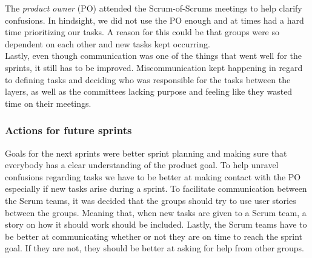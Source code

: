 \noindent The \textit{product owner} (PO) attended the Scrum-of-Scrums meetings to help clarify confusions. In hindsight, we did not use the PO enough and at times had a hard time prioritizing our tasks. A reason for this could be that groups were so dependent on each other and new tasks kept occurring. \\

\noindent Lastly, even though communication was one of the things that went well for the sprints, it still has to be improved. Miscommunication kept happening in regard to defining tasks and deciding who was responsible for the tasks between the layers, as well as the committees lacking purpose and feeling like they wasted time on their meetings.

\subsubsection{Actions for future sprints}
Goals for the next sprints were better sprint planning and making sure that everybody has a clear understanding of the product goal. 
To help unravel confusions regarding tasks we have to be better at making contact with the PO especially if new tasks arise during a sprint. 
To facilitate communication between the Scrum teams, it was decided that the groups should try to use user stories between the groups. Meaning that, when new tasks are given to a Scrum team, a story on how it should work should be included.
Lastly, the Scrum teams have to be better at communicating whether or not they are on time to reach the sprint goal. If they are not, they should be better at asking for help from other groups. 